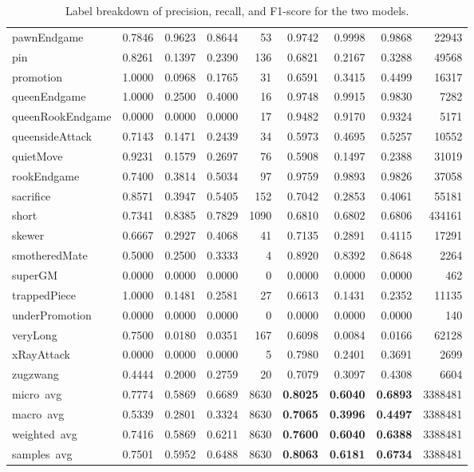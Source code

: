 \begin{table}[H]
\begin{adjustbox}{width=\textwidth}
\begin{tabular}{l|rrrr|rrrr}
      \rowcolor{lightgray} pawnEndgame&0.7846&0.9623&0.8644&53&0.9742&0.9998&0.9868&22943\\
      pin&0.8261&0.1397&0.2390&136&0.6821&0.2167&0.3288&49568\\
      promotion&1.0000&0.0968&0.1765&31&0.6591&0.3415&0.4499&16317\\
      \rowcolor{lightgray} queenEndgame&1.0000&0.2500&0.4000&16&0.9748&0.9915&0.9830&7282\\
      \rowcolor{lightgray} queenRookEndgame&0.0000&0.0000&0.0000&17&0.9482&0.9170&0.9324&5171\\
      queensideAttack&0.7143&0.1471&0.2439&34&0.5973&0.4695&0.5257&10552\\
      quietMove&0.9231&0.1579&0.2697&76&0.5908&0.1497&0.2388&31019\\
      \rowcolor{lightgray} rookEndgame&0.7400&0.3814&0.5034&97&0.9759&0.9893&0.9826&37058\\
      sacrifice&0.8571&0.3947&0.5405&152&0.7042&0.2853&0.4061&55181\\
      \rowcolor{lightgray} short&0.7341&0.8385&0.7829&1090&0.6810&0.6802&0.6806&434161\\
      skewer&0.6667&0.2927&0.4068&41&0.7135&0.2891&0.4115&17291\\
      smotheredMate&0.5000&0.2500&0.3333&4&0.8920&0.8392&0.8648&2264\\
      superGM&0.0000&0.0000&0.0000&0&0.0000&0.0000&0.0000&462\\
      trappedPiece&1.0000&0.1481&0.2581&27&0.6613&0.1431&0.2352&11135\\
      underPromotion&0.0000&0.0000&0.0000&0&0.0000&0.0000&0.0000&140\\
      veryLong&0.7500&0.0180&0.0351&167&0.6098&0.0084&0.0166&62128\\
      xRayAttack&0.0000&0.0000&0.0000&5&0.7980&0.2401&0.3691&2699\\
      zugzwang&0.4444&0.2000&0.2759&20&0.7079&0.3097&0.4308&6604\\
      \hline
      micro~avg&0.7774&0.5869&0.6689&8630&\textbf{0.8025}&\textbf{0.6040}&\textbf{0.6893}&3388481\\
      macro~avg&0.5339&0.2801&0.3324&8630&\textbf{0.7065}&\textbf{0.3996}&\textbf{0.4497}&3388481\\
      weighted~avg&0.7416&0.5869&0.6211&8630&\textbf{0.7600}&\textbf{0.6040}&\textbf{0.6388}&3388481\\
      samples~avg&0.7501&0.5952&0.6488&8630&\textbf{0.8063}&\textbf{0.6181}&\textbf{0.6734}&3388481\\
    \end{tabular}
  \end{adjustbox}
  \caption{Label breakdown of precision, recall, and F1-score for the two models.}
  \label{labelTable}
\end{table}


